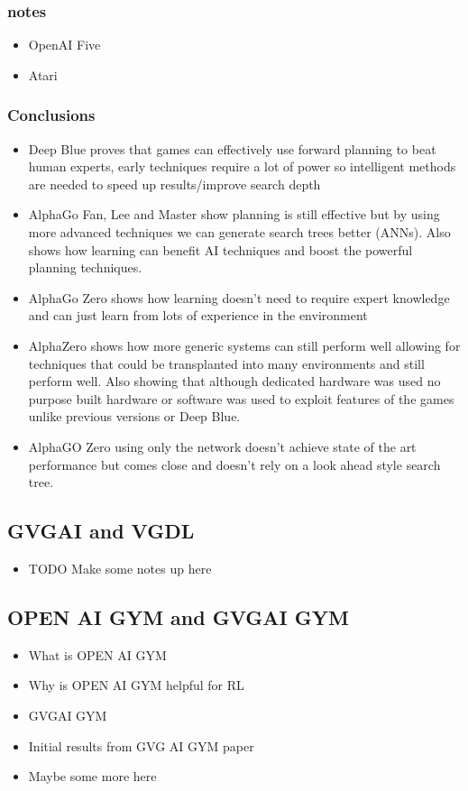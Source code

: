 \documentclass[a4paper]{article}
\begin{document}
\subsubsection{notes}

\begin{itemize}
    \item OpenAI Five
    \item Atari
\end{itemize}

\subsubsection{Conclusions}
\begin{itemize}
    \item Deep Blue proves that games can effectively use forward planning to beat human experts, early techniques require a lot of power so intelligent methods are needed to speed up results/improve search depth
    \item AlphaGo Fan, Lee and Master show planning is still effective but by using more advanced techniques we can generate search trees better (ANNs).
    Also shows how learning can benefit AI techniques and boost the powerful planning techniques.
    \item AlphaGo Zero shows how learning doesn't need to require expert knowledge and can just learn from lots of experience in the environment
    \item AlphaZero shows how more generic systems can still perform well allowing for techniques that could be transplanted into many environments and still perform well.
    Also showing that although dedicated hardware was used no purpose built hardware or software was used to exploit features of the games unlike previous versions or Deep Blue.
    \item AlphaGO Zero using only the network doesn't achieve state of the art performance but comes close and doesn't rely on a look ahead style search tree.
\end{itemize}


\subsection{GVGAI and VGDL}
\begin{itemize}
    \item TODO Make some notes up here
\end{itemize}
\subsection{OPEN AI GYM and GVGAI GYM}
\begin{itemize}
    \item What is OPEN AI GYM
    \item Why is OPEN AI GYM helpful for RL
    \item GVGAI GYM
    \item Initial results from GVG AI GYM paper
    \item Maybe some more here
\end{itemize}\cite{GVGAIGYM}
\end{document}
